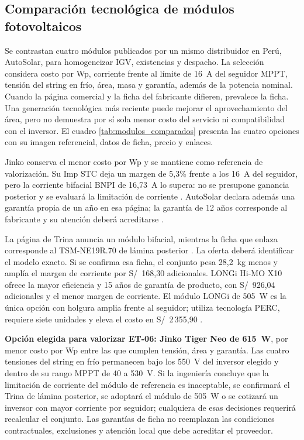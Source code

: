 \subsection{Comparación tecnológica de módulos fotovoltaicos}
Se contrastan cuatro módulos publicados por un mismo distribuidor en Perú, AutoSolar, para homogeneizar IGV, existencias y despacho. La selección considera costo por Wp, corriente frente al límite de 16~A del seguidor MPPT, tensión del string en frío, área, masa y garantía, además de la potencia nominal. Cuando la página comercial y la ficha del fabricante difieren, prevalece la ficha. Una generación tecnológica más reciente puede mejorar el aprovechamiento del área, pero no demuestra por sí sola menor costo del servicio ni compatibilidad con el inversor. El cuadro \ref{tab:modulos_comparados} presenta las cuatro opciones con su imagen referencial, datos de ficha, precio y enlaces.

Jinko conserva el menor costo por Wp y se mantiene como referencia de valorización. Su Imp STC deja un margen de 5,3\% frente a los 16~A del seguidor, pero la corriente bifacial BNPI de 16,73~A lo supera: no se presupone ganancia posterior y se evaluará la limitación de corriente \cite{jinko}. AutoSolar declara además una garantía propia de un año en esa página; la garantía de 12 años corresponde al fabricante y su atención deberá acreditarse \cite{preciojinko}.

La página de Trina anuncia un módulo bifacial, mientras la ficha que enlaza corresponde al TSM-NE19R.70 de lámina posterior \cite{trinaprecio,trinaficha}. La oferta deberá identificar el modelo exacto. Si se confirma esa ficha, el conjunto pesa 28,2~kg menos y amplía el margen de corriente por S/~168,30 adicionales. LONGi Hi-MO X10 ofrece la mayor eficiencia y 15 años de garantía de producto, con S/~926,04 adicionales y el menor margen de corriente. El módulo LONGi de 505~W es la única opción con holgura amplia frente al seguidor; utiliza tecnología PERC, requiere siete unidades y eleva el costo en S/~2\,355,90 \cite{longi505ficha}.

\textbf{Opción elegida para valorizar ET-06: Jinko Tiger Neo de 615~W}, por menor costo por Wp entre las que cumplen tensión, área y garantía. Las cuatro tensiones del string en frío permanecen bajo los 550~V del inversor elegido y dentro de su rango MPPT de 40 a 530~V. Si la ingeniería concluye que la limitación de corriente del módulo de referencia es inaceptable, se confirmará el Trina de lámina posterior, se adoptará el módulo de 505~W o se cotizará un inversor con mayor corriente por seguidor; cualquiera de esas decisiones requerirá recalcular el conjunto. Las garantías de ficha no reemplazan las condiciones contractuales, exclusiones y atención local que debe acreditar el proveedor.

